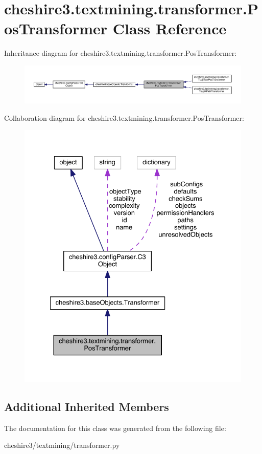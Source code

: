 \hypertarget{classcheshire3_1_1textmining_1_1transformer_1_1_pos_transformer}{\section{cheshire3.\-textmining.\-transformer.\-Pos\-Transformer Class Reference}
\label{classcheshire3_1_1textmining_1_1transformer_1_1_pos_transformer}
}


Inheritance diagram for cheshire3.\-textmining.\-transformer.\-Pos\-Transformer\-:
\nopagebreak
\begin{figure}[H]
\begin{center}
\leavevmode
\includegraphics[width=350pt]{classcheshire3_1_1textmining_1_1transformer_1_1_pos_transformer__inherit__graph}
\end{center}
\end{figure}


Collaboration diagram for cheshire3.\-textmining.\-transformer.\-Pos\-Transformer\-:
\nopagebreak
\begin{figure}[H]
\begin{center}
\leavevmode
\includegraphics[width=331pt]{classcheshire3_1_1textmining_1_1transformer_1_1_pos_transformer__coll__graph}
\end{center}
\end{figure}
\subsection*{Additional Inherited Members}


The documentation for this class was generated from the following file\-:\begin{DoxyCompactItemize}
\item 
cheshire3/textmining/transformer.\-py\end{DoxyCompactItemize}
